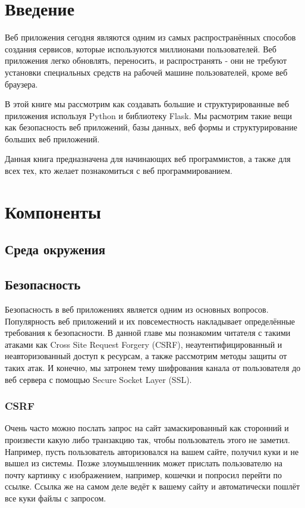 \chapter*{Введение}
Веб приложения сегодня являются одним из самых распространённых
способов создания сервисов, которые используются миллионами 
пользователей. Веб приложения легко обновлять, переносить, и 
распространять - они не требуют установки специальных средств 
на рабочей машине пользователей, кроме веб браузера.

В этой книге мы рассмотрим как создавать большие и структурированные
веб приложения используя Python и библиотеку Flask. Мы расмотрим
такие вещи как безопасность веб приложений, базы данных, веб формы
и структурирование больших веб приложений.

Данная книга предназначена для начинающих веб программистов, а также
для всех тех, кто желает познакомиться с веб программированием.

\chapter{Компоненты}

\section{Среда окружения}

\section{Безопасность}

Безопасность в веб приложениях является одним из основных
вопросов. Популярность веб приложений и их повсеместность 
накладывает определённые требования к безопасности. В данной
главе мы познакомим читателя с такими атаками как Cross
Site Request Forgery (CSRF), неаутентифицированный и неавторизованный
доступ к ресурсам, а также рассмотрим методы защиты от таких атак. 
И конечно, мы затронем тему шифрования канала от пользователя до веб 
сервера с помощью Secure Socket Layer (SSL).

\subsection{CSRF}

Очень часто можно послать запрос на сайт замаскированный как
сторонний и произвести какую либо транзакцию так, чтобы пользователь
этого не заметил. Например, пусть пользователь авторизовался на вашем
сайте, получил куки и не вышел из системы. Позже злоумышленник может
прислать пользователю на почту картинку с изображением, например, кошечки
и попросил перейти по ссылке. Ссылка же на самом деле ведёт к вашему
сайту и автоматически пошлёт все куки файлы с запросом. 

